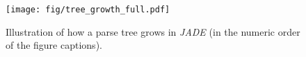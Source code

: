 \begin{figure}[h]
\centering
\texttt{[image: fig/tree\_growth\_full.pdf]}
        \caption{Illustration of how a parse tree grows in \textit{JADE} {\footnotesize (in the numeric order of the figure captions)}.}
        \label{fig:method:generative_example}
\end{figure}




